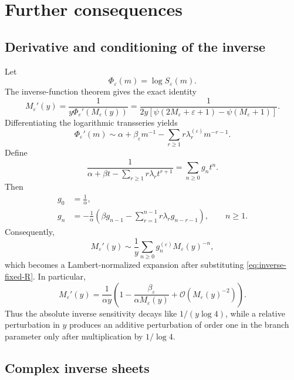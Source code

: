 \documentclass[11pt,a4paper]{article}
\theoremstyle{clean}
\theoremstyle{definition}
\newcommand{\eps}{\varepsilon}
\newcommand{\al}{\alpha}
\newcommand{\be}{\beta}
\newcommand{\OO}{\mathcal O}
\begin{document}
\section{Further consequences}
\label{sec:consequences}

\subsection{Derivative and conditioning of the inverse}

Let
\begin{equation}
 \Phi_\eps(m)=\log S_\eps(m).
 \label{eq:Phi-def}
\end{equation}
The inverse-function theorem gives the exact identity
\begin{equation}
 M_\eps'(y)=\frac1{y\Phi_\eps'(M_\eps(y))}
 =\frac1{2y\left[\psi(2M_\eps+\eps+1)-\psi(M_\eps+1)\right]}.
 \label{eq:inverse-derivative-exact}
\end{equation}
Differentiating the logarithmic transseries yields
\begin{equation}
 \Phi_\eps'(m)\sim
 \al+\be_\eps m^{-1}-\sum_{r\ge1}r\lambda_r^{(\eps)}m^{-r-1}.
 \label{eq:Phi-prime-series}
\end{equation}
Define
\begin{equation}
 \frac1{\al+\be t-\sum_{r\ge1}r\lambda_rt^{r+1}}
 =\sum_{n\ge0}g_nt^n.
 \label{eq:g-def}
\end{equation}
Then
\begin{align}
 g_0&=\frac1\al,
 \label{eq:g0}\\
 g_n&=-\frac1\al\left(
 \be g_{n-1}-\sum_{r=1}^{n-1}r\lambda_rg_{n-r-1}
 \right),\qquad n\ge1.
 \label{eq:g-recurrence}
\end{align}
Consequently,
\begin{equation}
 M_\eps'(y)\sim\frac1y\sum_{n\ge0}
 g_n^{(\eps)}M_\eps(y)^{-n},
 \label{eq:Mprime-series}
\end{equation}
which becomes a Lambert-normalized expansion after substituting \cref{eq:inverse-fixed-R}.  In particular,
\begin{equation}
 M_\eps'(y)=\frac1{\al y}
 \left(1-\frac{\be_\eps}{\al M_\eps(y)}+
 \OO(M_\eps(y)^{-2})\right).
 \label{eq:Mprime-leading}
\end{equation}
Thus the absolute inverse sensitivity decays like \(1/(y\log4)\), while a relative perturbation in \(y\) produces an additive perturbation of order one in the branch parameter only after multiplication by \(1/\log4\).

\subsection{Complex inverse sheets}
\end{document}
